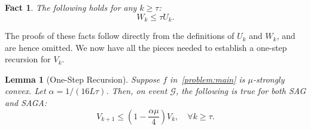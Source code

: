 \documentclass{article}
\theoremstyle{plain}
\newtheorem{lemma}[theorem]{Lemma}
\newtheorem{fact}[theorem]{Fact}
\theoremstyle{definition}
\newcommand{\cG}{\mathcal{G}}
\newcommand{\paren}[1]{\left( #1\right)}
\begin{document}
\begin{fact}\label{fact2}
The following holds for any $k\geq \tau$:
\begin{equation}
    W_k\leq \tau U_k.
\end{equation}
\end{fact}
The proofs of these facts follow directly from the definitions of $U_k$ and $W_k$, and are hence omitted. We now have all the pieces needed to establish a one-step recursion for $V_k$. 


\begin{lemma} [One-Step Recursion]
\label{lem:one-step}
Suppose $f$ in~\eqref{problem:main} is $\mu$-strongly convex. Let $\alpha= 1/(16 L \tau)$. Then, on event $\cG$, the following is true for both SAG and SAGA:
\begin{equation}
V_{k+1} \leq \paren{1-\frac{\alpha\mu}{4}}V_k,\quad \forall k \geq \tau.
\label{eqn:one-step-Lyap}
\end{equation}
\end{lemma}
\end{document}
